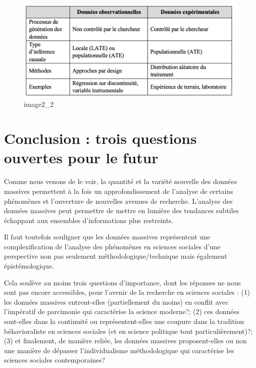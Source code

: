 \documentclass[
  letterpaper,
  DIV=11,
  numbers=noendperiod]{scrreprt}
\begin{document}
\begin{figure}[H]

{\centering \includegraphics{images/chapitre1_tableau.png}

}

\caption{image2\_2}

\end{figure}%

\section*{Conclusion : trois questions ouvertes pour le
futur}\label{conclusion-trois-questions-ouvertes-pour-le-futur}


Comme nous venons de le voir, la quantité et la variété nouvelle des
données massives permettent à la fois un approfondissement de l'analyse
de certains phénomènes et l'ouverture de nouvelles avenues de recherche.
L'analyse des données massives peut permettre de mettre en lumière des
tendances subtiles échappant aux ensembles d'informations plus
restreints.

Il faut toutefois souligner que les données massives représentent une
complexification de l'analyse des phénomènes en sciences sociales d'une
perspective non pas seulement méthodologique/technique mais également
épistémologique.

Cela soulève au moins trois questions d'importance, dont les réponses ne
nous sont pas encore accessibles, pour l'avenir de la recherche en
sciences sociales : (1) les données massives entrent-elles
(partiellement du moins) en conflit avec l'impératif de parcimonie qui
caractérise la science moderne?; (2) ces données sont-elles dans la
continuité ou représentent-elles une coupure dans la tradition
béhavioraliste en sciences sociales (et en science politique tout
particulièrement)?; (3) et finalement, de manière reliée, les données
massives proposent-elles ou non une manière de dépasser l'individualisme
méthodologique qui caractérise les sciences sociales contemporaines?
\end{document}
